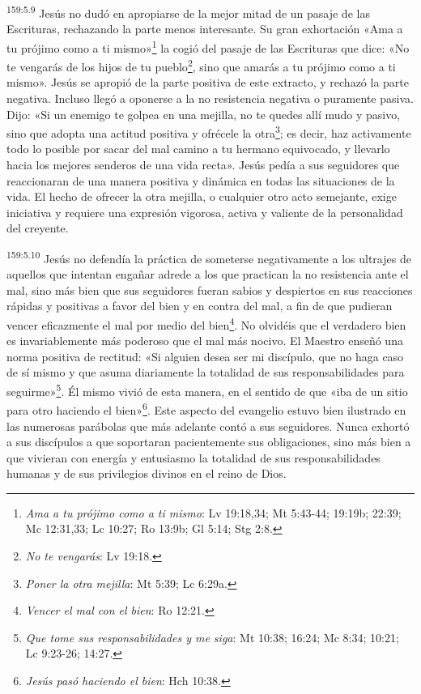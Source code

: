 \par 
\textsuperscript{159:5.9} Jesús no dudó en apropiarse de la mejor mitad de un pasaje de las Escrituras, rechazando la parte menos interesante. Su gran exhortación «Ama a tu prójimo como a ti mismo»\footnote{\textit{Ama a tu prójimo como a ti mismo}: Lv 19:18,34; Mt 5:43-44; 19:19b; 22:39; Mc 12:31,33; Lc 10:27; Ro 13:9b; Gl 5:14; Stg 2:8.} la cogió del pasaje de las Escrituras que dice: «No te vengarás de los hijos de tu pueblo\footnote{\textit{No te vengarás}: Lv 19:18.}, sino que amarás a tu prójimo como a ti mismo». Jesús se apropió de la parte positiva de este extracto, y rechazó la parte negativa. Incluso llegó a oponerse a la no resistencia negativa o puramente pasiva. Dijo: «Si un enemigo te golpea en una mejilla, no te quedes allí mudo y pasivo, sino que adopta una actitud positiva y ofrécele la otra\footnote{\textit{Poner la otra mejilla}: Mt 5:39; Lc 6:29a.}; es decir, haz activamente todo lo posible por sacar del mal camino a tu hermano equivocado, y llevarlo hacia los mejores senderos de una vida recta». Jesús pedía a sus seguidores que reaccionaran de una manera positiva y dinámica en todas las situaciones de la vida. El hecho de ofrecer la otra mejilla, o cualquier otro acto semejante, exige iniciativa y requiere una expresión vigorosa, activa y valiente de la personalidad del creyente.

\par 
\textsuperscript{159:5.10} Jesús no defendía la práctica de someterse negativamente a los ultrajes de aquellos que intentan engañar adrede a los que practican la no resistencia ante el mal, sino más bien que sus seguidores fueran sabios y despiertos en sus reacciones rápidas y positivas a favor del bien y en contra del mal, a fin de que pudieran vencer eficazmente el mal por medio del bien\footnote{\textit{Vencer el mal con el bien}: Ro 12:21.}. No olvidéis que el verdadero bien es invariablemente más poderoso que el mal más nocivo. El Maestro enseñó una norma positiva de rectitud: «Si alguien desea ser mi discípulo, que no haga caso de sí mismo y que asuma diariamente la totalidad de sus responsabilidades para seguirme»\footnote{\textit{Que tome sus responsabilidades y me siga}: Mt 10:38; 16:24; Mc 8:34; 10:21; Lc 9:23-26; 14:27.}. Él mismo vivió de esta manera, en el sentido de que «iba de un sitio para otro haciendo el bien»\footnote{\textit{Jesús pasó haciendo el bien}: Hch 10:38.}. Este aspecto del evangelio estuvo bien ilustrado en las numerosas parábolas que más adelante contó a sus seguidores. Nunca exhortó a sus discípulos a que soportaran pacientemente sus obligaciones, sino más bien a que vivieran con energía y entusiasmo la totalidad de sus responsabilidades humanas y de sus privilegios divinos en el reino de Dios.

